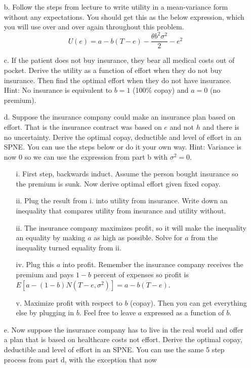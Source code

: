 \documentclass{article}
\begin{document}
\begin{enumerate}
\begin{enumerate}
        \item[b.] Follow the steps from lecture to write utility in a mean-variance form without any expectations. You should get this as the below expression, which you will use over and over again throughout this problem.
         \[U(e) = a-b(T-e) - \frac{\theta b^2\sigma^2}{2} - e^2\]
         
         \item[c.] If the patient does not buy insurance, they bear all medical costs out of pocket. Derive the utility as a function of effort when they do not buy insurance. Then find the optimal effort when they do not have insurance. Hint: No insurance is equivalent to $b=1$ (100\% copay) and $a=0$ (no premium).
         
         
         \item[d.] Suppose the insurance company could make an insurance plan based on effort. That is the insurance contract was based on $e$ and not $h$ and there is no uncertainty. Derive the optimal copay, deductible and level of effort in an SPNE. You can use the steps below or do it your own way. Hint: Variance is now $0$ so we can use the expression from part b with $\sigma^2=0$.
         \begin{enumerate}
             \item[i.] First step, backwards induct. Assume the person bought insurance so the premium is sunk. Now derive optimal effort given fixed copay.
             \item[ii.] Plug the result from i. into utility from insurance. Write down an inequality that compares utility from insurance and utility without.
             \item[ii.] The insurance company maximizes profit, so it will make the inequality an equality by making $a$ as high as possible. Solve for $a$ from the inequality turned equality from ii.
             \item[iv.] Plug this $a$ into profit. Remember the insurance company receives the premium and pays $1-b$ percent of expenses so profit is $E[a-(1-b)N(T-e,\sigma^2)]=a-b(T-e)$.
             \item[v.] Maximize profit with respect to $b$ (copay). Then you can get everything else by plugging in $b$. Feel free to leave $a$ expressed as a function of $b$.
             
         \end{enumerate}
        
        \item[e.] Now suppose the insurance company has to live in the real world and offer a plan that is based on healthcare costs not effort. Derive the optimal copay, deductible and level of effort in an SPNE. You can use the same 5 step process from part d, with the exception that now 
        

\end{enumerate}
\end{enumerate}
\end{document}
